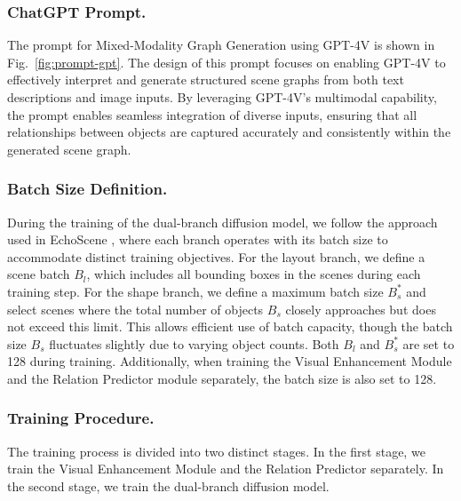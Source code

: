 \subsubsection{ChatGPT Prompt.}
The prompt for Mixed-Modality Graph Generation using GPT-4V is shown in Fig.~\ref{fig:prompt-gpt}. The design of this prompt focuses on enabling GPT-4V to effectively interpret and generate structured scene graphs from both text descriptions and image inputs. By leveraging GPT-4V's multimodal capability, the prompt enables seamless integration of diverse inputs, ensuring that all relationships between objects are captured accurately and consistently within the generated scene graph.



\subsubsection{Batch Size Definition.}
During the training of the dual-branch diffusion model, we follow the approach used in EchoScene \cite{zhai2024echoscene}, where each branch operates with its batch size to accommodate distinct training objectives. 
For the layout branch, we define a scene batch $B_l$, which includes all bounding boxes in the scenes during each training step.
For the shape branch, we define a maximum batch size \( B^*_s \) and select scenes where the total number of objects \( B_s \) closely approaches but does not exceed this limit. This allows efficient use of batch capacity, though the batch size \( B_s \) fluctuates slightly due to varying object counts. Both \( B_l \) and \( B^*_s \) are set to 128 during training.
Additionally, when training the Visual Enhancement Module and the Relation Predictor module separately, the batch size is also set to 128.

\subsubsection{Training Procedure.}
The training process is divided into two distinct stages. In the first stage, we train the Visual Enhancement Module and the Relation Predictor separately. In the second stage, we train the dual-branch diffusion model.

